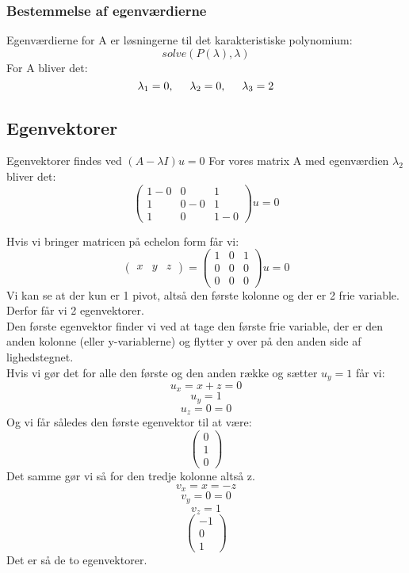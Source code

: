 \documentclass{article}
\begin{document}
\subsubsection{Bestemmelse af egenværdierne}
Egenværdierne for A er løsningerne til det karakteristiske polynomium:\\
\begin{displaymath}
solve(P(\lambda),\lambda)
\end{displaymath}
For A bliver det:
$$\lambda_1 = 0, \hspace{5mm} \lambda_2 = 0, \hspace{5mm} \lambda_3 = 2$$

\subsection{Egenvektorer}
Egenvektorer findes ved $(A-\lambda I)u=0$
For vores matrix A med egenværdien $\lambda_2$ bliver det:
$$\begin{pmatrix}
1-0 & 0 & 1\\
1 & 0-0 & 1\\
1 & 0 & 1-0
\end{pmatrix}u=0$$

Hvis vi bringer matricen på echelon form får vi:
$$\begin{pmatrix}x&y&z\end{pmatrix}=\begin{pmatrix}
1 & 0 & 1\\
0 & 0 & 0\\
0 & 0 & 0
\end{pmatrix}u=0$$
Vi kan se at der kun er 1 pivot, altså den første kolonne og der er 2 frie 
variable. Derfor får vi 2 egenvektorer.\\
Den første egenvektor finder vi ved at tage den første frie variable, der er 
den anden kolonne (eller y-variablerne) og flytter y over på den anden side af 
lighedstegnet.\\
Hvis vi gør det for alle den første og den anden række og sætter $u_y=1$ får vi:
$$u_x=x+z=0$$
$$u_y=1$$
$$u_z=0=0$$
Og vi får således den første egenvektor til at være:
$$\begin{pmatrix}0\\1\\0\end{pmatrix}$$
Det samme gør vi så for den tredje kolonne altså z.
$$v_x=x=-z$$
$$v_y=0=0$$
$$v_z=1$$
$$\begin{pmatrix}-1\\0\\1\end{pmatrix}$$
Det er så de to egenvektorer.
\end{document}
